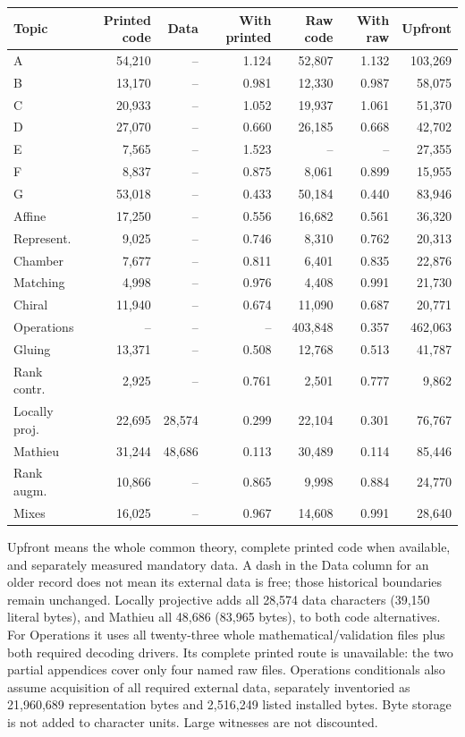 \documentclass[11pt,a4paper]{article}
\newcommand{\tabsetup}{\small\setlength{\tabcolsep}{4pt}\renewcommand{\arraystretch}{1.10}}
\begin{document}
\begin{center}\tabsetup\begin{tabular}{lrrrrrr}\toprule
Topic & Printed code & Data & With printed & Raw code & With raw & Upfront\\\midrule
A & 54,210 & -- & 1.124 & 52,807 & 1.132 & 103,269 \\
B & 13,170 & -- & 0.981 & 12,330 & 0.987 & 58,075 \\
C & 20,933 & -- & 1.052 & 19,937 & 1.061 & 51,370 \\
D & 27,070 & -- & 0.660 & 26,185 & 0.668 & 42,702 \\
E & 7,565 & -- & 1.523 & -- & -- & 27,355 \\
F & 8,837 & -- & 0.875 & 8,061 & 0.899 & 15,955 \\
G & 53,018 & -- & 0.433 & 50,184 & 0.440 & 83,946 \\
Affine & 17,250 & -- & 0.556 & 16,682 & 0.561 & 36,320 \\
Represent. & 9,025 & -- & 0.746 & 8,310 & 0.762 & 20,313 \\
Chamber & 7,677 & -- & 0.811 & 6,401 & 0.835 & 22,876 \\
Matching & 4,998 & -- & 0.976 & 4,408 & 0.991 & 21,730 \\
Chiral & 11,940 & -- & 0.674 & 11,090 & 0.687 & 20,771 \\
Operations & -- & -- & -- & 403,848 & 0.357 & 462,063 \\
Gluing & 13,371 & -- & 0.508 & 12,768 & 0.513 & 41,787 \\
Rank contr. & 2,925 & -- & 0.761 & 2,501 & 0.777 & 9,862 \\
Locally proj. & 22,695 & 28,574 & 0.299 & 22,104 & 0.301 & 76,767 \\
Mathieu & 31,244 & 48,686 & 0.113 & 30,489 & 0.114 & 85,446 \\
Rank augm. & 10,866 & -- & 0.865 & 9,998 & 0.884 & 24,770 \\
Mixes & 16,025 & -- & 0.967 & 14,608 & 0.991 & 28,640 \\
\bottomrule\end{tabular}\end{center}
Upfront means the whole common theory, complete printed code when available, and separately measured mandatory data. A dash in the Data column for an older record does not mean its external data is free; those historical boundaries remain unchanged. Locally projective adds all 28,574 data characters (39,150 literal bytes), and Mathieu all 48,686 (83,965 bytes), to both code alternatives. For Operations it uses all twenty-three whole mathematical/validation files plus both required decoding drivers. Its complete printed route is unavailable: the two partial appendices cover only four named raw files. Operations conditionals also assume acquisition of all required external data, separately inventoried as 21,960,689 representation bytes and 2,516,249 listed installed bytes. Byte storage is not added to character units. Large witnesses are not discounted.
\end{document}
